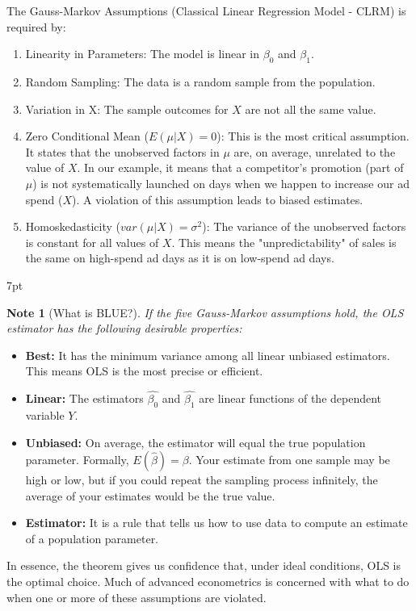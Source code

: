 \documentclass{article}
\providecommand{\tightlist}{
  \setlength{\itemsep}{0pt}
  \setlength{\parskip}{0pt}}
\newenvironment{blueblock}{
\def\FrameCommand{
  \hspace{1pt}
    {\color{DarkBlue}
    \vrule width 2pt}
    {\color{blueshade}
    \vrule width 4pt}
  \colorbox{blueshade}
}
\MakeFramed{
  \advance
  \hsize-
  \width
  \FrameRestore}
\noindent\hspace{-4.55pt}%
\begin{adjustwidth}{}{7pt}
\vspace{2pt}\vspace{2pt}
}
{\vspace{2pt}\end{adjustwidth}\endMakeFramed}
\newtheorem{note}{Note}
\begin{document}
The Gauss-Markov Assumptions (Classical Linear Regression Model - CLRM) is required by:
\begin{enumerate}
  \item Linearity in Parameters: The model is linear in $\beta_0$ and $\beta_1$.
  \item Random Sampling: The data is a random sample from the population.
  \item Variation in X: The sample outcomes for $X$ are not all the same value.
  \item Zero Conditional Mean ($E(\mu|X) = 0$): This is the most critical assumption. It states that the unobserved factors in $\mu$ are, on average, unrelated to the value of $X$. In our example, it means that a competitor's promotion (part of $\mu$) is not systematically launched on days when we happen to increase our ad spend ($X$). A violation of this assumption leads to biased estimates.
  \item Homoskedasticity ($var(\mu|X) = \sigma^2$): The variance of the unobserved factors is constant for all values of $X$. This means the "unpredictability" of sales is the same on high-spend ad days as it is on low-spend ad days.
\end{enumerate}


\begin{blueblock}
\begin{note}[What is BLUE?]
If the five Gauss-Markov assumptions hold, the OLS estimator has the following desirable properties:
\end{note}
\begin{itemize}
    \tightlist
    \item \textbf{Best:} It has the minimum variance among all linear unbiased estimators. This means OLS is the most precise or efficient.
    \item \textbf{Linear:} The estimators $\hat{\beta_0}$ and $\hat{\beta_1}$ are linear functions of the dependent variable $Y$.
    \item \textbf{Unbiased:} On average, the estimator will equal the true population parameter. Formally, $E(\hat{\beta})=\beta$. Your estimate from one sample may be high or low, but if you could repeat the sampling process infinitely, the average of your estimates would be the true value.
    \item \textbf{Estimator:} It is a rule that tells us how to use data to compute an estimate of a population parameter.
\end{itemize}
In essence, the theorem gives us confidence that, under ideal conditions, OLS is the optimal choice. Much of advanced econometrics is concerned with what to do when one or more of these assumptions are violated.
\end{blueblock}
\end{document}
